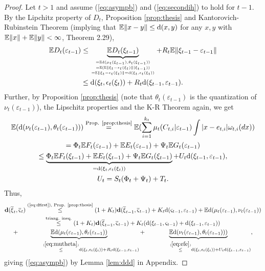\documentclass{article}              %
\begin{document}
\begin{proof}
Let $t>1$ and assume (\ref{eq:asympb}) and (\ref{eq:secondih})
to hold for $t-1$.
By the Lipchitz property of $D_t$, Proposition \ref{prop:thesis} and Kantorovich-Rubinstein Theorem (implying that $\mathbb{E}\|x-y\| \leq \mathrm{d}(x,y)$ for any $x,y$ with $\mathbb{E}\|x\|+\mathbb{E}\|y\|<\infty$,
\cite{pflug2014multistage} Theorem 2.29), 
\begin{multline}
\mathbb{E} D_{t}(\varepsilon_{t-1})
\leq
\underbrace{\mathbb{E} D_{t}(\xi_{t-1})}_
{{=\mathbb{E}\mathrm{d}(\mu_t(\xi_{t-1}),\theta_t(\xi_{t-1}))
\atop
=
\mathbb{E}(\mathbb{E}\|\xi_{t}-\epsilon_t(\xi_{t})\| |\xi_{t-1}))}
\atop
{=\mathbb{E}\|\xi_{t}-\epsilon_t(\xi_{t})\|=
\mathrm{d}(\xi_t,\epsilon_t(\xi_t))}}
+
R_t \mathbb{E}\|\xi_{t-1}-\varepsilon_{t-1}\|
\\
\leq \mathrm{d}(\xi_t,\epsilon_t(\xi_t))+R_{t}\mathrm{d}(\xi_{t-1},\varepsilon_{t-1}).
\label{eq:mutheta}
\end{multline}
Further, by Proposition \ref{prop:thesis} (note that $\theta_{t}(\varepsilon_{t-1})$
is the quantization of $\nu_{t}(\varepsilon_{t-1})$), the Lipschitz properties and the K-R
Theorem again, we get
\begin{multline}
\mathbb{E}(\mathrm{d}(\nu_{t}(\varepsilon_{t-1}),\theta_{t}(\varepsilon_{t-1})))
\stackrel{\text{Prop. \ref{prop:thesis}}}
=\mathbb{E}(\sum_{i=1}^{k_{t}}\mu_{t}(C_{t,i}|\varepsilon_{t-1})\int|x-e_{t,i}|\omega_{t,i}(dx))\\
=\Phi_{t}\mathbb{E} F_{t}(\varepsilon_{t-1})+\mathbb{E} E_{t}(\varepsilon_{t-1})+\Psi_{t}\mathbb{E} G_{t}(\varepsilon_{t-1})
\\
\leq\underbrace{\Phi_{t}\mathbb{E} F_{t}(\xi_{t-1})+\mathbb{E} E_{t}(\xi_{t-1})+\Psi_{t}\mathbb{E} G_{t}(\xi_{t-1})}_{=\mathrm{d}(\xi_{t},\epsilon_{t}(\xi_{t}))}+U_{t}\mathrm{d}(\xi_{t-1},\varepsilon_{t-1}),\\
U_{t}=S_{t}(\Phi_{t}+\Psi_{t})+T_{t}.\label{eq:efe}
\end{multline}
Thus,
\begin{multline*}
\mathbf{d}(\overline{\xi}_{t},\overline{\varsigma}_{t})
\stackrel{\text{(\ref{eq:dfirst}), Prop. \ref{prop:thesis}}}
\leq
(1+K_{t})\mathbf{d}(\overline{\xi}_{t-1},\overline{\varsigma}_{t-1})+K_{t}\mathrm{d}(\varsigma_{t-1},\varepsilon_{t-1})+\mathbb{E}\mathrm{d}(\mu_{t}(\varepsilon_{t-1}),\nu_{t}(\varepsilon_{t-1}))\\
\stackrel{\text{triang. ineq.}}
\leq
(1+K_{t})\mathbf{d}(\overline{\xi}_{t-1},\overline{\varsigma}_{t-1})+K_{t}(\mathrm{d}(\xi_{t-1},\varsigma_{t-1})+\mathrm{d}(\xi_{t-1},\varepsilon_{t-1}))\\
+
\underbrace
{\mathbb{E}\mathrm{d}(\mu_{t}(\varepsilon_{t-1}),\theta_{t}(\varepsilon_{t-1}))}
_{\qquad\qquad \stackrel{(\ref{eq:mutheta})}\leq \mathrm{d}(\xi_t,\epsilon_t(\xi_t))+ R_{t}\mathrm{d}(\xi_{t-1},\varepsilon_{t-1})}
+
\underbrace
{\mathbb{E}\mathrm{d}(\nu_{t}(\varepsilon_{t-1}),\theta_{t}(\varepsilon_{t-1})))}
_
{\qquad\qquad\stackrel{(\ref{eq:efe})}\leq \mathrm{d}(\xi_t,\epsilon_t(\xi_t))+ U_{t}\mathrm{d}(\xi_{t-1},\varepsilon_{t-1})},
\end{multline*}
giving (\ref{eq:asympb}) by Lemma \ref{lem:ddd} in Appendix. 


\end{proof}
\end{document}
